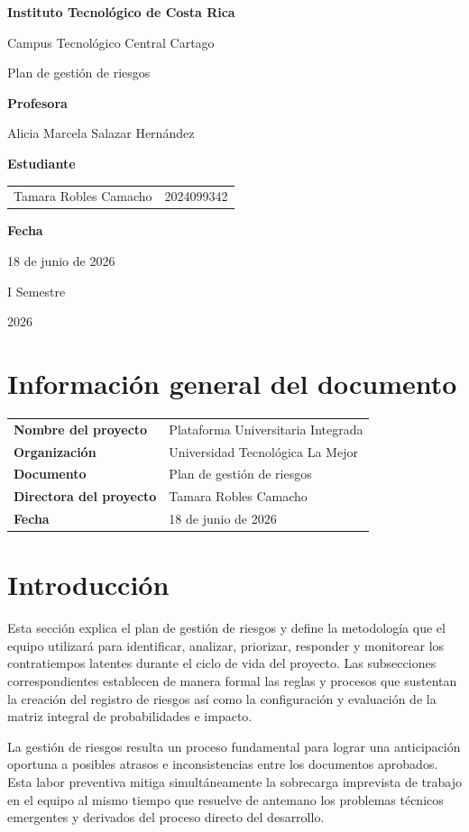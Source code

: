 \documentclass[11pt,spanish]{article}
\title{\DocumentoTitulo}
\author{\AutoresPortada}
\date{\FechaDocumento}
\makeatletter
\newcommand{\Institucion}{Instituto Tecnológico de Costa Rica}
\newcommand{\Campus}{Campus Tecnológico Central Cartago}
\newcommand{\DocumentoTitulo}{Plan de gestión de riesgos}
\newcommand{\Profesor}{Alicia Marcela Salazar Hernández}
\newcommand{\FechaDocumento}{18 de junio de 2026}
\newcommand{\PeriodoAcademico}{I Semestre}
\newcommand{\AnioDocumento}{2026}
\newcommand{\AutoresPortada}{%
    \begin{tabular}{l@{\hspace{1.5cm}}r}
        Tamara Robles Camacho & 2024099342 \\
    \end{tabular}%
}
\newcommand{\MakeCover}{%
\begin{titlepage}
\thispagestyle{empty}
\centering

{\bfseries \huge \Institucion \par}
\vspace{0.25cm}
{\LARGE \Campus \par}

\vfill

{\huge \DocumentoTitulo \par}

\vfill

{\bfseries \LARGE Profesora \par}
{\Large \Profesor \par}

\vfill

{\bfseries \LARGE Estudiante \par}
{\Large \AutoresPortada \par}

\vfill

{\bfseries\LARGE Fecha \par}
{\Large \FechaDocumento \par}

\vfill

{\LARGE \PeriodoAcademico \par}
{\LARGE \AnioDocumento \par}

\end{titlepage}%
}
\makeatother
\begin{document}
\hypersetup{pageanchor=false}

\MakeCover

\pagestyle{empty}
\tableofcontents
\clearpage
{}
\hypersetup{pageanchor=true}
\pagestyle{fancy}

\section{Información general del documento}

\begin{table}[H]
\centering
\begin{tabularx}{\textwidth}{p{5cm} Y}
\toprule
\textbf{Nombre del proyecto} & Plataforma Universitaria Integrada \\
\textbf{Organización} & Universidad Tecnológica La Mejor \\
\textbf{Documento} & \DocumentoTitulo \\
\textbf{Directora del proyecto} & Tamara Robles Camacho \\
\textbf{Fecha} & \FechaDocumento \\
\bottomrule
\end{tabularx}
\end{table}

\section{Introducción}

Esta sección explica el plan de gestión de riesgos y define la metodología que el equipo utilizará para identificar, analizar, priorizar, responder y monitorear los contratiempos latentes durante el ciclo de vida del proyecto. Las subsecciones correspondientes establecen de manera formal las reglas y procesos que sustentan la creación del registro de riesgos así como la configuración y evaluación de la matriz integral de probabilidades e impacto.

La gestión de riesgos resulta un proceso fundamental para lograr una anticipación oportuna a posibles atrasos e inconsistencias entre los documentos aprobados. Esta labor preventiva mitiga simultáneamente la sobrecarga imprevista de trabajo en el equipo al mismo tiempo que resuelve de antemano los problemas técnicos emergentes y derivados del proceso directo del desarrollo.
\end{document}
